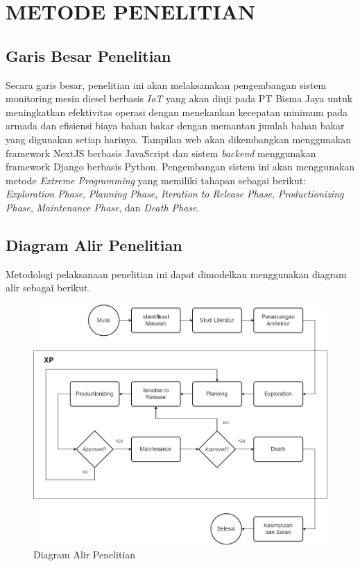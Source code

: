 \chapter{METODE PENELITIAN}

\section{Garis Besar Penelitian}

Secara garis besar, penelitian ini akan melaksanakan pengembangan sistem monitoring mesin diesel berbasis \textit{IoT} yang akan diuji pada PT Bisma Jaya untuk meningkatkan efektivitas operasi dengan menekankan kecepatan minimum pada armada dan efisiensi biaya bahan bakar dengan memantau jumlah bahan bakar yang digunakan setiap harinya. Tampilan web akan dikembangkan menggunakan framework NextJS berbasis JavaScript dan sistem \textit{backend} menggunakan framework Django berbasis Python. Pengembangan sistem ini akan menggunakan metode \textit{Extreme Programming} yang memiliki tahapan sebagai berikut: \textit{Exploration Phase}, \textit{Planning Phase}, \textit{Iteration to Release Phase}, \textit{Productionizing Phase}, \textit{Maintenance Phase}, dan \textit{Death Phase}.

\section{Diagram Alir Penelitian}

Metodologi pelaksanaan penelitian ini dapat dimodelkan menggunakan diagram alir sebagai berikut.

\begin{figure}[!h]
    \includegraphics[width=1.1\linewidth, center]{images/metode/flowchart-penelitian.jpg}
    \caption{Diagram Alir Penelitian}
    \label{fig:flow-research}
\end{figure}


